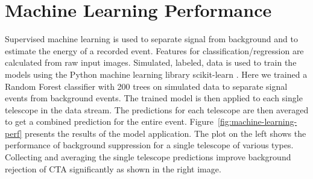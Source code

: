 \documentclass[11pt,twoside]{article}
\begin{document}


\section{Machine Learning Performance}

Supervised machine learning is used to separate signal from background and to estimate the energy of a recorded event.
Features for classification/regression are calculated from raw input images.
Simulated, labeled, data is used to train the models using the Python machine learning library scikit-learn \citep{sklearn}.
Here we trained a Random Forest classifier with 200 trees on simulated data to separate signal events from background events. 
The trained model is then applied to each single telescope in the data stream. 
The predictions for each telescope are then averaged to get a combined prediction for the entire event.
Figure~\ref{fig:machine-learning-perf} presents the results of the model application.
The plot on the left shows the performance of background suppression for a single telescope of various types.
Collecting and averaging the single telescope predictions improve background rejection of CTA significantly as shown in the right image.






\end{document}
